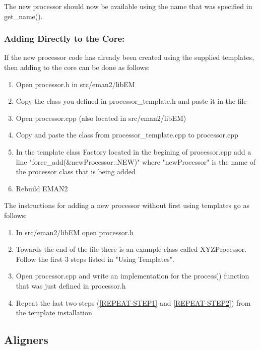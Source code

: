       The new processor should now be available using the name that was
      specified in get_name().



  \subsubsection{Adding Directly to the Core:}

  If the new processor code has already been created using the supplied
  templates, then adding to the core can be done as follows:
  \begin{enumerate}
    \item
      Open processor.h in src/eman2/libEM
    \item
      Copy the class you defined in processor_template.h and paste it
      in the file
    \item
      Open processor.cpp (also located in src/eman2/libEM)
    \item
      Copy and paste the class from processor_template.cpp to
      processor.cpp
    \item \label{REPEAT-STEP1}
      In the template class Factory located in the begining of
      processor.cpp add a line "force_add(\&newProcessor::NEW)" where
      "newProcessor" is the name of the processor class that is being
      added 
   \item \label {REPEAT-STEP2}
     Rebuild EMAN2
  \end{enumerate}

  The instructions for adding a new processor without first using
  templates go as follows:
  \begin{enumerate}
    \item
      In src/eman2/libEM open processor.h
    \item
      Towards the end of the file there is an example class called
      XYZProcessor.  Follow the first 3 steps listed in "Using
      Templates". 
    \item
      Open processor.cpp and write an implementation for the process() 
      function that was just defined in processor.h
    \item
      Repeat the last two steps (\ref{REPEAT-STEP1} and \ref{REPEAT-STEP2})
      from the template installation
  \end{enumerate}

\subsection{Aligners} 
  \label{ADDING-ALIGNERS} 

